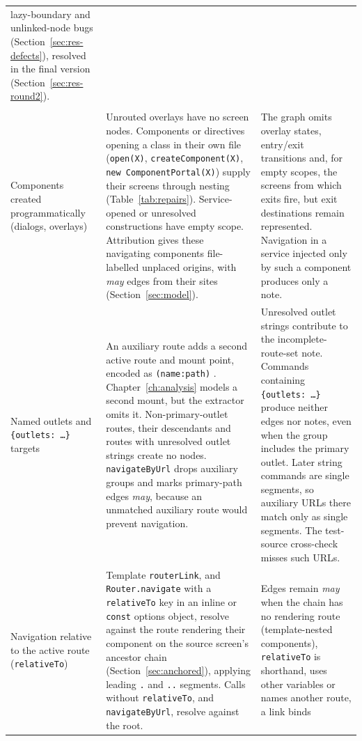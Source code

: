 \begin{xltabular}{\textwidth}{@{}>{\raggedright\arraybackslash}p{2.7cm}YY@{}}
lazy-boundary and unlinked-node bugs (Section~\ref{sec:res-defects}), resolved in the final version (Section~\ref{sec:res-round2}). \\
\addlinespace[2pt]
\\
\addlinespace[2pt]
Components created programmatically (dialogs, overlays)
& Unrouted overlays have no screen nodes. Components or directives opening a class in their own file
(\texttt{open(X)}, \texttt{createComponent(X)}, \texttt{new ComponentPortal(X)}) supply their
screens through nesting (Table~\ref{tab:repairs}). Service-opened or unresolved constructions have empty
scope. Attribution gives these navigating components file-labelled unplaced origins, with \emph{may}
edges from their sites (Section~\ref{sec:model}).
& The graph omits overlay states, entry/exit transitions and, for empty scopes, the screens from which
exits fire, but exit destinations remain represented. Navigation in a service injected only by such a
component produces only a note. \\
Named outlets and \texttt{\{outlets: \ldots\}} targets
& An auxiliary route adds a second active route and mount point, encoded as \texttt{(name:path)}
\cite{angulardocs}.
Chapter~\ref{ch:analysis} models a second mount, but the extractor omits it. Non-primary-outlet
routes, their descendants and routes with unresolved outlet strings create no nodes.
\texttt{navigateByUrl} drops auxiliary groups and marks primary-path edges \emph{may}, because an
unmatched auxiliary route would prevent navigation.
& Unresolved outlet strings contribute to the incomplete-route-set note.
Commands containing \texttt{\{outlets: \ldots\}} produce neither edges nor notes, even when the group
includes the primary outlet. Later string commands are single segments, so auxiliary URLs there match
only as single segments. The test-source cross-check misses such URLs. \\
Navigation relative to the active route (\texttt{relativeTo})
& Template \texttt{routerLink}, and \texttt{Router.navigate} with a \texttt{relativeTo} key in an inline
or \texttt{const} options object, resolve against the route rendering their component on the source
screen's ancestor chain (Section~\ref{sec:anchored}), applying leading \texttt{.} and \texttt{..}
segments. Calls without \texttt{relativeTo}, and \texttt{navigateByUrl}, resolve against the root.
& Edges remain \emph{may} when the chain has no rendering route (template-nested components),
\texttt{relativeTo} is shorthand, uses other variables or names another route, a link binds

\end{xltabular}
